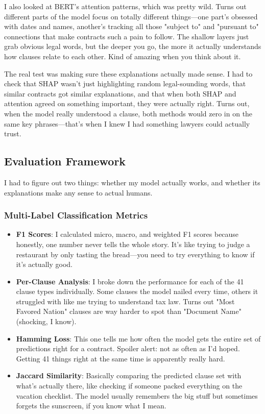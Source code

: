 I also looked at BERT's attention patterns, which was pretty wild. Turns out different parts of the model focus on totally different things—one part's obsessed with dates and names, another's tracking all those "subject to" and "pursuant to" connections that make contracts such a pain to follow. The shallow layers just grab obvious legal words, but the deeper you go, the more it actually understands how clauses relate to each other. Kind of amazing when you think about it.

The real test was making sure these explanations actually made sense. I had to check that SHAP wasn't just highlighting random legal-sounding words, that similar contracts got similar explanations, and that when both SHAP and attention agreed on something important, they were actually right. Turns out, when the model really understood a clause, both methods would zero in on the same key phrases—that's when I knew I had something lawyers could actually trust.
\subsection{Evaluation Framework}

I had to figure out two things: whether my model actually works, and whether its explanations make any sense to actual humans.

\subsubsection{Multi-Label Classification Metrics}

\begin{itemize}
    \item \textbf{F1 Scores}: I calculated micro, macro, and weighted F1 scores because honestly, one number never tells the whole story. It's like trying to judge a restaurant by only tasting the bread—you need to try everything to know if it's actually good.
    \item \textbf{Per-Clause Analysis}: I broke down the performance for each of the 41 clause types individually. Some clauses the model nailed every time, others it struggled with like me trying to understand tax law. Turns out "Most Favored Nation" clauses are way harder to spot than "Document Name" (shocking, I know).
    \item \textbf{Hamming Loss}: This one tells me how often the model gets the entire set of predictions right for a contract. Spoiler alert: not as often as I'd hoped. Getting 41 things right at the same time is apparently really hard.
    \item \textbf{Jaccard Similarity}: Basically comparing the predicted clause set with what's actually there, like checking if someone packed everything on the vacation checklist. The model usually remembers the big stuff but sometimes forgets the sunscreen, if you know what I mean.
\end{itemize}


